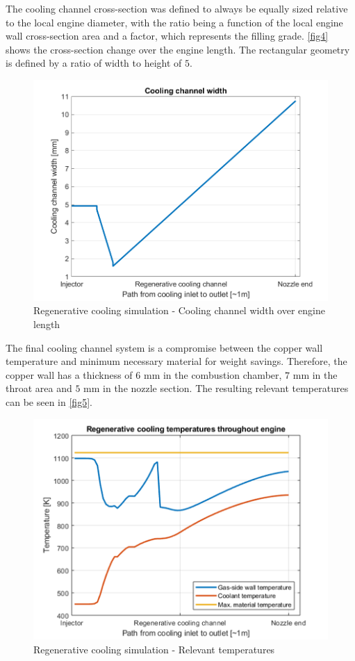  The cooling channel cross-section was defined to always be equally sized relative to the local engine diameter, with the ratio being a function of the local engine wall cross-section area and a factor, which represents the filling grade. \autoref{fig4} shows the cross-section change over the engine length. The rectangular geometry is defined by a ratio of width to height of $5$.

\begin{figure}[H]
	\centering\includegraphics[width=0.9\linewidth]{coolingchannelwidth}
	\caption{Regenerative cooling simulation - Cooling channel width over engine length}\label{fig4}
\end{figure}

The final cooling channel system is a compromise between the copper wall temperature and minimum necessary material for weight savings. Therefore, the copper wall has a thickness of $6$ mm in the combustion chamber, $7$ mm in the throat area and $5$ mm in the nozzle section. The resulting relevant temperatures can be seen in \autoref{fig5}.

\begin{figure}[H]
	\centering\includegraphics[width=0.9\linewidth]{relevanttemps}
	\caption{Regenerative cooling simulation - Relevant temperatures}\label{fig5}
\end{figure}

